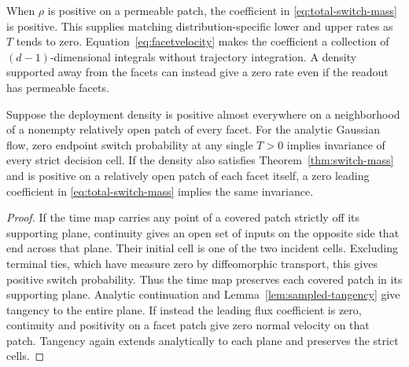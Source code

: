 When $\rho$ is positive on a permeable patch, the coefficient in
\eqref{eq:total-switch-mass} is positive. This supplies matching
distribution-specific lower and upper rates as $T$ tends to zero.
Equation~\eqref{eq:facetvelocity} makes the coefficient a collection of
$(d-1)$-dimensional integrals without trajectory integration. A density
supported away from the facets can instead give a zero rate even if
the readout has permeable facets.

\begin{corollary}
Suppose the deployment density is positive almost everywhere on a
neighborhood of a nonempty relatively open patch of every facet.
For the analytic Gaussian flow, zero endpoint switch probability
at any single $T>0$ implies invariance of every strict decision cell.
If the density also satisfies Theorem~\ref{thm:switch-mass} and is
positive on a relatively open patch of each facet itself, a zero
leading coefficient in \eqref{eq:total-switch-mass} implies the
same invariance.
\end{corollary}

\begin{proof}
If the time map carries any point of a covered patch strictly off
its supporting plane, continuity gives an open set of inputs on
the opposite side that end across that plane. Their initial cell
is one of the two incident cells. Excluding terminal ties, which
have measure zero by diffeomorphic transport, this gives positive
switch probability. Thus the time map preserves each covered patch
in its supporting plane. Analytic continuation and
Lemma~\ref{lem:sampled-tangency} give tangency to the entire plane.
If instead the leading flux coefficient is zero, continuity and
positivity on a facet patch give zero normal velocity on that patch.
Tangency again extends analytically to each plane and preserves the
strict cells.
\end{proof}

